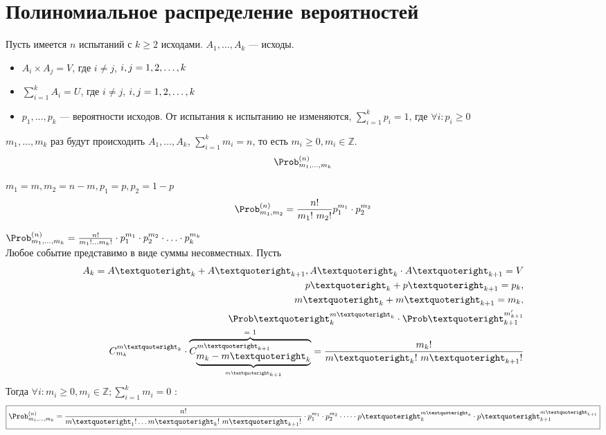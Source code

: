 \section{Полиномиальное распределение вероятностей}
Пусть имеется $n$ испытаний с $k \geqslant 2$ исходами. $A_1, \dots, A_k$ --- исходы.
\begin{itemize}
  \item $A_i \times A_j = V$, где $i \not = j$, $i, j = 1,2,\dots,k$
  \item $\sum\limits_{i=1}^k A_i = U$, где $i \not = j$, $i, j = 1,2,\dots,k$
  \item $p_1, \dots, p_k$ --- вероятности исходов. От испытания к испытанию не изменяются, $\sum\limits_{i=1}^k p_i = 1$, где $\forall i: p_i \geq 0$
\end{itemize}
$m_1, \dots, m_k$ раз будут происходить $A_1, \dots, A_k$, $\sum\limits_{i=1}^k m_i = n$, то есть $m_i \geq 0, m_i \in \mathbb{Z}$. \\
\[ \Prob_{m_1, \dots, m_k}^{(n)} \]
\begin{description}[leftmargin=0cm]
  \item[$k = 2, \Prob_{m_1, m_2}^{(n)}:$] $m_1 = m, m_2 = n-m, p_1 = p, p_2 = 1-p$
  \[
    \Prob_{m_1, m_2}^{(n)} = \frac{n!}{m_1 !\ m_2 !} p_1^{m_1} \cdot p_2^{m_2}
  \]
  \item[$k \ge 2:$] $\Prob_{m_1, \ldots, m_k}^{(n)} = \frac{n!}{m_1 ! \ldots m_k !} \cdot p_1^{m_1} \cdot p_2^{m_2} \cdot \ldots \cdot p_k^{m_k}$ \\
  Любое событие представимо в виде суммы несовместных. Пусть
  \[
    \begin{split}
    A_k = A’_k + A’_{k+1}, A’_k \cdot A’_{k+1} = V \\
    p’_k + p’_{k+1} = p_k, \\
    m’_k + m’_{k+1} = m_k, \\
    {\Prob’}_{k}^{m’_{k}} \cdot {\Prob’}_{k+1}^{m'_{k+1}} \\
    C_{m_k}^{{m’}_k} \cdot \overbrace{ C_{\underbrace{{m_k - {m’}_k}}_{{m’}_{k+1}}}^{{m’}_{k+1}} }^{\text{= 1}} = \frac{m_k !}{{m’}_k !\ {m’}_{k+1} !}
    \end{split}
  \]
  Тогда $ \forall i : m_i \geqslant 0, m_i \in \mathbb{Z};  \sum\limits_{i=1}^k m_i = 0$ :
  \[
    \boxed{\Prob_{m_1, \dots, m_k}^{(n)} = \frac{n!}{{m’}_1 ! \ldots {m’}_k !\ {m’}_{k+1} !} \cdot p_1^{m_1} \cdot p_2^{m_2} \cdot \dots \cdot {p’}_k^{{m’}_k} \cdot {p’}_{k+1}^{{m’}_{k+1}}}
  \]
\end{description}

